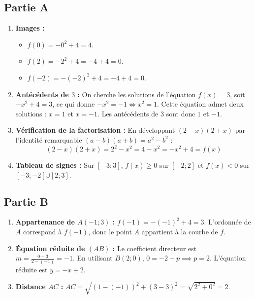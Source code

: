 \documentclass[11pt,a4paper]{article}
\begin{document}
\subsection*{Partie A}
\begin{enumerate}
    \item \textbf{Images :}
    \begin{itemize}
        \item $f(0) = -0^2 + 4 = 4$.
        \item $f(2) = -2^2 + 4 = -4 + 4 = 0$.
        \item $f(-2) = -(-2)^2 + 4 = -4 + 4 = 0$.
    \end{itemize}
    \item \textbf{Antécédents de $3$ :}
    On cherche les solutions de l'équation $f(x) = 3$, soit $-x^2 + 4 = 3$, ce qui donne $-x^2 = -1 \iff x^2 = 1$.
    Cette équation admet deux solutions : $x = 1$ et $x = -1$. Les antécédents de $3$ sont donc $1$ et $-1$.
    \item \textbf{Vérification de la factorisation :}
    En développant $(2 - x)(2 + x)$ par l'identité remarquable $(a-b)(a+b) = a^2 - b^2$ :
    $$(2 - x)(2 + x) = 2^2 - x^2 = 4 - x^2 = -x^2 + 4 = f(x)$$
    \item \textbf{Tableau de signes :}
    Sur $[-3 ; 3]$, $f(x) \ge 0$ sur $[-2 ; 2]$ et $f(x) < 0$ sur $[-3 ; -2[ \cup ]2 ; 3]$.
\end{enumerate}

\subsection*{Partie B}
\begin{enumerate}
    \item \textbf{Appartenance de $A(-1 ; 3)$ :}
    $f(-1) = -(-1)^2 + 4 = 3$. L'ordonnée de $A$ correspond à $f(-1)$, donc le point $A$ appartient à la courbe de $f$.
    \item \textbf{Équation réduite de $(AB)$ :}
    Le coefficient directeur est $m = \frac{0 - 3}{2 - (-1)} = -1$.
    En utilisant $B(2 ; 0)$, $0 = -2 + p \implies p = 2$. L'équation réduite est $y = -x + 2$.
    \item \textbf{Distance $AC$ :}
    $AC = \sqrt{(1 - (-1))^2 + (3 - 3)^2} = \sqrt{2^2 + 0^2} = 2$.
\end{enumerate}
\end{document}
